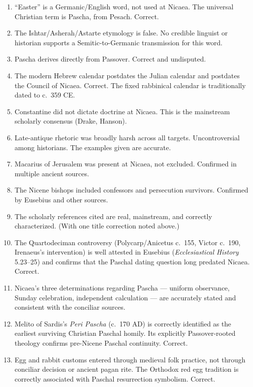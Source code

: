\documentclass[10pt,twoside,openany]{book}
\begin{document}
\begin{enumerate}[leftmargin=1.5em]
\item ``Easter'' is a Germanic/English word, not used at Nicaea. The
     universal Christian term is Pascha, from Pesach. Correct.

\item The Ishtar/Asherah/Astarte etymology is false. No credible
     linguist or historian supports a Semitic-to-Germanic transmission
     for this word.

\item Pascha derives directly from Passover. Correct and undisputed.

\item The modern Hebrew calendar postdates the Julian calendar and
     postdates the Council of Nicaea. Correct. The fixed rabbinical
     calendar is traditionally dated to c.\ 359 CE.

\item Constantine did not dictate doctrine at Nicaea. This is the
     mainstream scholarly consensus (Drake, Hanson).

\item Late-antique rhetoric was broadly harsh across all targets.
     Uncontroversial among historians. The examples given are accurate.

\item Macarius of Jerusalem was present at Nicaea, not excluded.
     Confirmed in multiple ancient sources.

\item The Nicene bishops included confessors and persecution survivors.
     Confirmed by Eusebius and other sources.

\item The scholarly references cited are real, mainstream, and correctly
     characterized. (With one title correction noted above.)

\item The Quartodeciman controversy (Polycarp/Anicetus c.\ 155, Victor
     c.\ 190, Irenaeus's intervention) is well attested in Eusebius
     (\emph{Ecclesiastical History} 5.23--25) and confirms that the
     Paschal dating question long predated Nicaea. Correct.

\item Nicaea's three determinations regarding Pascha --- uniform
     observance, Sunday celebration, independent calculation --- are
     accurately stated and consistent with the conciliar sources.

\item Melito of Sardis's \emph{Peri Pascha} (c.\ 170 AD) is correctly
     identified as the earliest surviving Christian Paschal homily.
     Its explicitly Passover-rooted theology confirms pre-Nicene
     Paschal continuity. Correct.

\item Egg and rabbit customs entered through medieval folk practice,
     not through conciliar decision or ancient pagan rite. The Orthodox
     red egg tradition is correctly associated with Paschal resurrection
     symbolism. Correct.
\end{enumerate}
\end{document}
